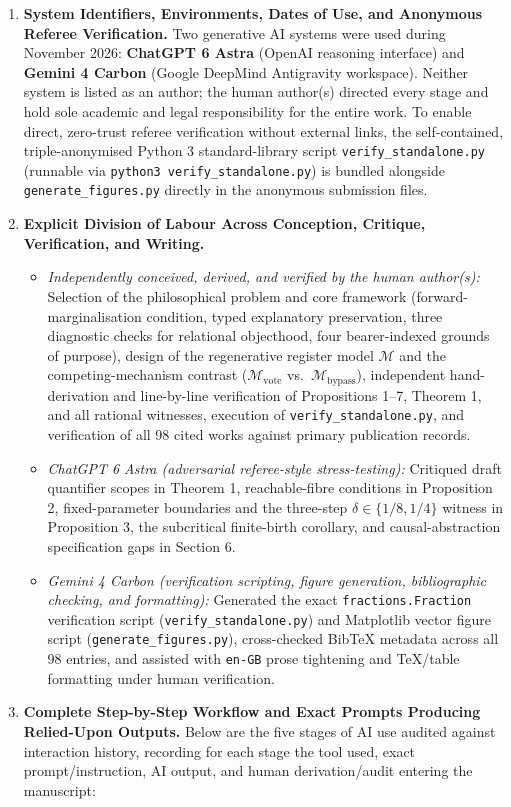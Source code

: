\documentclass[12pt,letterpaper]{article}
\providecommand{\tightlist}{\setlength{\itemsep}{2pt}\setlength{\parskip}{0pt}}
\begin{document}
\begin{enumerate}
\def\labelenumi{\arabic{enumi}.}
\tightlist
\item
  \textbf{System Identifiers, Environments, Dates of Use, and Anonymous
  Referee Verification.} Two generative AI systems were used during
  November 2026: \textbf{ChatGPT 6 Astra} (OpenAI reasoning interface)
  and \textbf{Gemini 4 Carbon} (Google DeepMind Antigravity workspace).
  Neither system is listed as an author; the human author(s) directed
  every stage and hold sole academic and legal responsibility for the
  entire work. To enable direct, zero-trust referee verification without
  external links, the self-contained, triple-anonymised Python 3
  standard-library script \texttt{verify\_standalone.py} (runnable via
  \texttt{python3\ verify\_standalone.py}) is bundled alongside
  \texttt{generate\_figures.py} directly in the anonymous submission
  files.
\item
  \textbf{Explicit Division of Labour Across Conception, Critique,
  Verification, and Writing.}

  \begin{itemize}
  \tightlist
  \item
    \emph{Independently conceived, derived, and verified by the human
    author(s):} Selection of the philosophical problem and core
    framework (forward-marginalisation condition, typed explanatory
    preservation, three diagnostic checks for relational objecthood,
    four bearer-indexed grounds of purpose), design of the regenerative
    register model \(\mathcal{M}\) and the competing-mechanism contrast
    (\(\mathcal{M}_{\mathrm{vote}}\)
    vs.~\(\mathcal{M}_{\mathrm{bypass}}\)), independent hand-derivation
    and line-by-line verification of Propositions 1--7, Theorem 1, and
    all rational witnesses, execution of \texttt{verify\_standalone.py},
    and verification of all 98 cited works against primary publication
    records.
  \item
    \emph{ChatGPT 6 Astra (adversarial referee-style stress-testing):}
    Critiqued draft quantifier scopes in Theorem 1, reachable-fibre
    conditions in Proposition 2, fixed-parameter boundaries and the
    three-step \(\delta \in \{1/8, 1/4\}\) witness in Proposition 3, the
    subcritical finite-birth corollary, and causal-abstraction
    specification gaps in Section 6.
  \item
    \emph{Gemini 4 Carbon (verification scripting, figure generation,
    bibliographic checking, and formatting):} Generated the exact
    \texttt{fractions.Fraction} verification script
    (\texttt{verify\_standalone.py}) and Matplotlib vector figure script
    (\texttt{generate\_figures.py}), cross-checked BibTeX metadata
    across all 98 entries, and assisted with \texttt{en-GB} prose
    tightening and TeX/table formatting under human verification.
  \end{itemize}
\item
  \textbf{Complete Step-by-Step Workflow and Exact Prompts Producing
  Relied-Upon Outputs.} Below are the five stages of AI use audited
  against interaction history, recording for each stage the tool used,
  exact prompt/instruction, AI output, and human derivation/audit
  entering the manuscript:


\end{enumerate}
\end{document}
